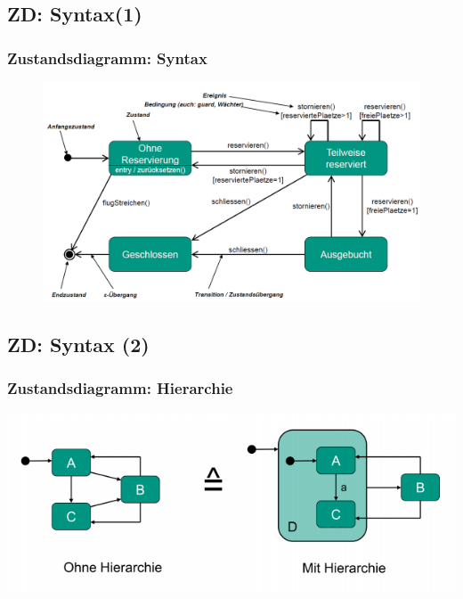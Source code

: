 \documentclass[18pt]{beamer}
\begin{document}
	\subsection{ZD: Syntax(1)}
	\begin{frame}
		\frametitle{Zustandsdiagramm: Syntax}
		\begin{figure}
			\includegraphics[scale=0.4]{./pics/tut2/auto_swt.png}
		\end{figure}	
	\end{frame}

	\subsection{ZD: Syntax (2)}
	\begin{frame}
		\frametitle{Zustandsdiagramm: Hierarchie}
		\includegraphics[scale=0.7]{./pics/tut2/auto_hier.png}	
	\end{frame}
\end{document}
